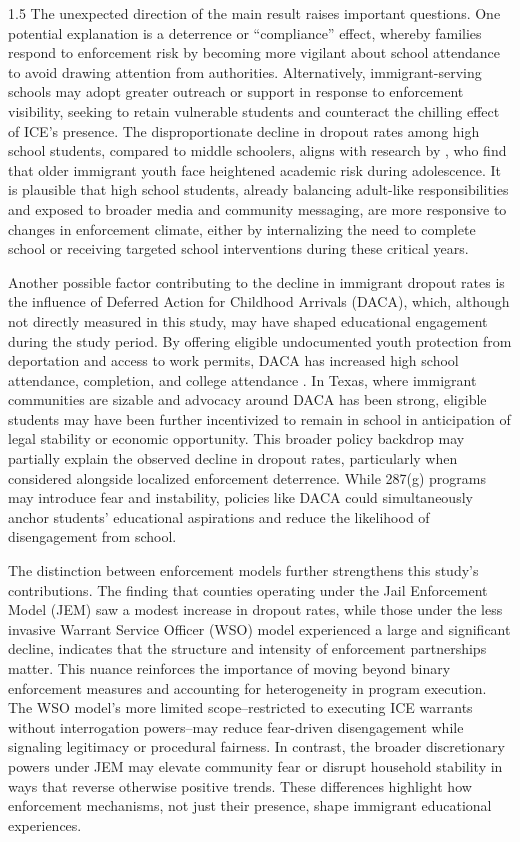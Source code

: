 \documentclass[12pt]{article}
\begin{document}
\begin{spacing}{1.5}
The unexpected direction of the main result raises important questions. One potential explanation is a deterrence or “compliance” effect, whereby families respond to enforcement risk by becoming more vigilant about school attendance to avoid drawing attention from authorities. Alternatively, immigrant-serving schools may adopt greater outreach or support in response to enforcement visibility, seeking to retain vulnerable students and counteract the chilling effect of ICE's presence. The disproportionate decline in dropout rates among high school students, compared to middle schoolers, aligns with research by \citet{suarez2010}, who find that older immigrant youth face heightened academic risk during adolescence. It is plausible that high school students, already balancing adult-like responsibilities and exposed to broader media and community messaging, are more responsive to changes in enforcement climate, either by internalizing the need to complete school or receiving targeted school interventions during these critical years.

Another possible factor contributing to the decline in immigrant dropout rates is the influence of Deferred Action for Childhood Arrivals (DACA), which, although not directly measured in this study, may have shaped educational engagement during the study period. By offering eligible undocumented youth protection from deportation and access to work permits, DACA has increased high school attendance, completion, and college attendance \citep{kuka2020}. In Texas, where immigrant communities are sizable and advocacy around DACA has been strong, eligible students may have been further incentivized to remain in school in anticipation of legal stability or economic opportunity. This broader policy backdrop may partially explain the observed decline in dropout rates, particularly when considered alongside localized enforcement deterrence. While 287(g) programs may introduce fear and instability, policies like DACA could simultaneously anchor students’ educational aspirations and reduce the likelihood of disengagement from school.

The distinction between enforcement models further strengthens this study’s contributions. The finding that counties operating under the Jail Enforcement Model (JEM) saw a modest increase in dropout rates, while those under the less invasive Warrant Service Officer (WSO) model experienced a large and significant decline, indicates that the structure and intensity of enforcement partnerships matter. This nuance reinforces the importance of moving beyond binary enforcement measures and accounting for heterogeneity in program execution. The WSO model’s more limited scope–restricted to executing ICE warrants without interrogation powers–may reduce fear-driven disengagement while signaling legitimacy or procedural fairness. In contrast, the broader discretionary powers under JEM may elevate community fear or disrupt household stability in ways that reverse otherwise positive trends. These differences highlight how enforcement mechanisms, not just their presence, shape immigrant educational experiences.


\end{spacing}
\end{document}
